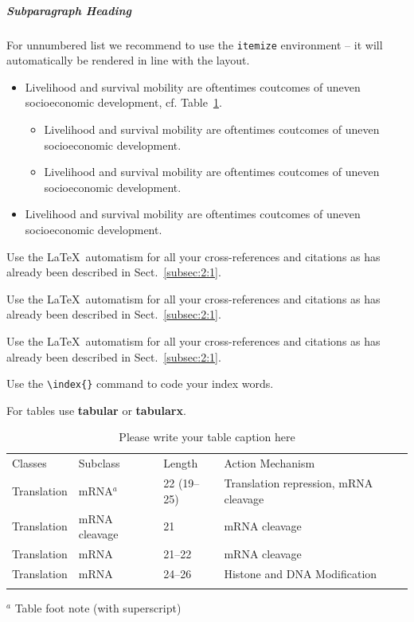 \begin{bibunit}
	
	\subparagraph{Subparagraph Heading}\label{subp:1:1}
	
	For unnumbered list we recommend to use the \verb|itemize| environment -- it will automatically be rendered in line with the layout.
	
	\begin{itemize}
		\item{Livelihood and survival mobility are oftentimes coutcomes of uneven socioeconomic development, cf. Table~\ref{tab:1}.}
		\begin{itemize}
			\item{Livelihood and survival mobility are oftentimes coutcomes of uneven socioeconomic development.}
			\item{Livelihood and survival mobility are oftentimes coutcomes of uneven socioeconomic development.}
		\end{itemize}
		\item{Livelihood and survival mobility are oftentimes coutcomes of uneven socioeconomic development.}
	\end{itemize}
	
	 Use the \LaTeX\ automatism for all your cross-references and citations as has already been described in Sect.~\ref{subsec:2:1}.
	
	 Use the \LaTeX\ automatism for all your cross-references and citations as has already been described in Sect.~\ref{subsec:2:1}.
	
	 Use the \LaTeX\ automatism for all your cross-references and citations as has already been described in Sect.~\ref{subsec:2:1}.
	
	Use the \verb|\index{}| command to code your index words.
	
	For tables use \textbf{tabular} or \textbf{tabularx}.
	
	\begin{table}[!t]
		\caption{Please write your table caption here}
		\label{tab:1} %
		\begin{tabular}{p{2cm}p{2.4cm}p{2cm}p{4.9cm}}
			\hline\noalign{\smallskip}
			Classes & Subclass & Length & Action Mechanism  \\
			\noalign{\smallskip}\svhline\noalign{\smallskip}
			Translation & mRNA$^a$  & 22 (19--25) & Translation repression, mRNA cleavage\\
			Translation & mRNA cleavage & 21 & mRNA cleavage\\
			Translation & mRNA  & 21--22 & mRNA cleavage\\
			Translation & mRNA  & 24--26 & Histone and DNA Modification\\
			\noalign{\smallskip}\hline\noalign{\smallskip}
		\end{tabular}
		$^a$ Table foot note (with superscript)
	\end{table}

\end{bibunit}
